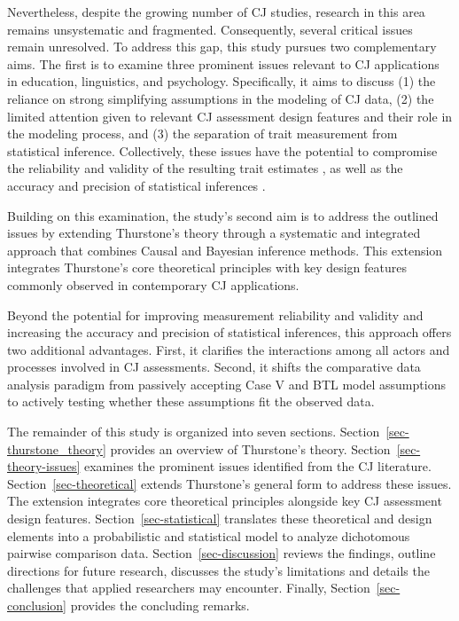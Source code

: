 \documentclass[
  authoryear,
  review,
  1p]{elsarticle}
\begin{document}
Nevertheless, despite the growing number of CJ studies, research in this
area remains unsystematic and fragmented. Consequently, several critical
issues remain unresolved. To address this gap, this study pursues two
complementary aims. The first is to examine three prominent issues
relevant to CJ applications in education, linguistics, and psychology.
Specifically, it aims to discuss (1) the reliance on strong simplifying
assumptions in the modeling of CJ data, (2) the limited attention given
to relevant CJ assessment design features and their role in the modeling
process, and (3) the separation of trait measurement from statistical
inference. Collectively, these issues have the potential to compromise
the reliability and validity of the resulting trait estimates
\citep{Zimmerman_1994, Perron_et_al_2015, McElreath_2020}, as well as
the accuracy and precision of statistical inferences
\citep{McElreath_2020, Kline_et_al_2023, Hoyle_et_al_2023}.

Building on this examination, the study's second aim is to address the
outlined issues by extending Thurstone's theory through a systematic and
integrated approach that combines Causal and Bayesian inference methods.
This extension integrates Thurstone's core theoretical principles with
key design features commonly observed in contemporary CJ applications.

Beyond the potential for improving measurement reliability and validity
and increasing the accuracy and precision of statistical inferences,
this approach offers two additional advantages. First, it clarifies the
interactions among all actors and processes involved in CJ assessments.
Second, it shifts the comparative data analysis paradigm from passively
accepting Case V and BTL model assumptions to actively testing whether
these assumptions fit the observed data.

The remainder of this study is organized into seven sections.
Section~\ref{sec-thurstone_theory} provides an overview of Thurstone's
theory. Section~\ref{sec-theory-issues} examines the prominent issues
identified from the CJ literature. Section~\ref{sec-theoretical} extends
Thurstone's general form to address these issues. The extension
integrates core theoretical principles alongside key CJ assessment
design features. Section~\ref{sec-statistical} translates these
theoretical and design elements into a probabilistic and statistical
model to analyze dichotomous pairwise comparison data.
Section~\ref{sec-discussion} reviews the findings, outline directions
for future research, discusses the study's limitations and details the
challenges that applied researchers may encounter. Finally,
Section~\ref{sec-conclusion} provides the concluding remarks.
\end{document}
